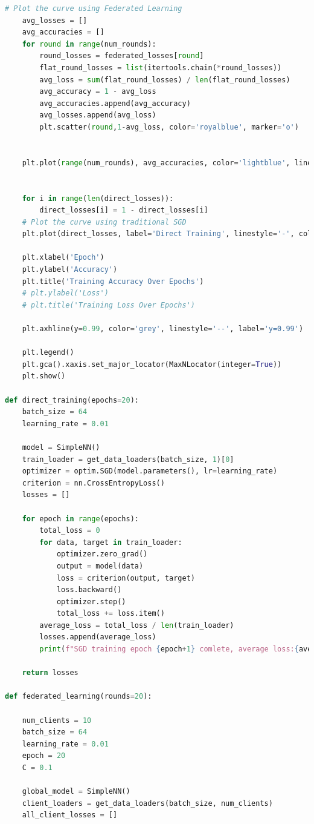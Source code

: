 \documentclass[a4paper,12pt]{article}
\begin{document}
\begin{lstlisting}[language=Python, caption=Complete Code Implementation]
    # Plot the curve using Federated Learning
    avg_losses = []
    avg_accuracies = []
    for round in range(num_rounds):
        round_losses = federated_losses[round]
        flat_round_losses = list(itertools.chain(*round_losses))
        avg_loss = sum(flat_round_losses) / len(flat_round_losses)
        avg_accuracy = 1 - avg_loss
        avg_accuracies.append(avg_accuracy)
        avg_losses.append(avg_loss)
        plt.scatter(round,1-avg_loss, color='royalblue', marker='o')


    plt.plot(range(num_rounds), avg_accuracies, color='lightblue', linestyle='-', label='Federated Learning')


    for i in range(len(direct_losses)):
        direct_losses[i] = 1 - direct_losses[i]
    # Plot the curve using traditional SGD
    plt.plot(direct_losses, label='Direct Training', linestyle='-', color='black')
    
    plt.xlabel('Epoch')
    plt.ylabel('Accuracy')
    plt.title('Training Accuracy Over Epochs')
    # plt.ylabel('Loss')
    # plt.title('Training Loss Over Epochs')

    plt.axhline(y=0.99, color='grey', linestyle='--', label='y=0.99')

    plt.legend()
    plt.gca().xaxis.set_major_locator(MaxNLocator(integer=True))
    plt.show()

def direct_training(epochs=20):
    batch_size = 64
    learning_rate = 0.01

    model = SimpleNN()
    train_loader = get_data_loaders(batch_size, 1)[0]
    optimizer = optim.SGD(model.parameters(), lr=learning_rate)
    criterion = nn.CrossEntropyLoss()
    losses = []

    for epoch in range(epochs):
        total_loss = 0
        for data, target in train_loader:
            optimizer.zero_grad()
            output = model(data)
            loss = criterion(output, target)
            loss.backward()
            optimizer.step()
            total_loss += loss.item()
        average_loss = total_loss / len(train_loader)
        losses.append(average_loss)
        print(f"SGD training epoch {epoch+1} comlete, average loss:{average_loss}")

    return losses

def federated_learning(rounds=20):

    num_clients = 10
    batch_size = 64
    learning_rate = 0.01
    epoch = 20
    C = 0.1

    global_model = SimpleNN()
    client_loaders = get_data_loaders(batch_size, num_clients)
    all_client_losses = []


\end{lstlisting}
\end{document}
